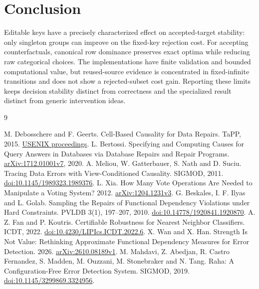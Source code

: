 \documentclass[11pt]{article}
\begin{document}
\section{Conclusion}
Editable keys have a precisely characterized effect on accepted-target
stability: only singleton groups can improve on the fixed-key rejection cost.
For accepting counterfactuals, canonical row dominance preserves exact optima
while reducing raw categorical choices. The implementations have finite
validation and bounded computational value, but reused-source evidence is
concentrated in fixed-infinite transitions and does not show a rejected-subset
cost gain. Reporting these limits keeps decision stability distinct from
correctness and the specialized result distinct from generic intervention ideas.

\begin{thebibliography}{9}
\raggedright
{} M. Debosschere and F. Geerts.
Cell-Based Causality for Data Repairs. TaPP, 2015.
\href{https://www.usenix.org/conference/tapp15/workshop-program/presentation/debosschere}{USENIX proceedings}.
 L. Bertossi. Specifying and Computing Causes for Query
Answers in Databases via Database Repairs and Repair Programs.
\href{https://arxiv.org/abs/1712.01001v7}{arXiv:1712.01001v7}, 2020.
 A. Meliou, W. Gatterbauer, S. Nath and D. Suciu.
Tracing Data Errors with View-Conditioned Causality. SIGMOD, 2011.
\href{https://doi.org/10.1145/1989323.1989376}{doi:10.1145/1989323.1989376}.
 L. Xia. How Many Vote Operations Are Needed to Manipulate a
Voting System? 2012. \href{https://arxiv.org/abs/1204.1231v3}{arXiv:1204.1231v3}.
 G. Beskales, I. F. Ilyas and L. Golab. Sampling the Repairs
of Functional Dependency Violations under Hard Constraints. PVLDB 3(1),
197--207, 2010. \href{https://doi.org/10.14778/1920841.1920870}{doi:10.14778/1920841.1920870}.
 A. Z. Fan and P. Koutris. Certifiable Robustness for Nearest
Neighbor Classifiers. ICDT, 2022.
\href{https://doi.org/10.4230/LIPIcs.ICDT.2022.6}{doi:10.4230/LIPIcs.ICDT.2022.6}.
 X. Wan and X. Han. Strength Is Not Value: Rethinking Approximate
Functional Dependency Measures for Error Detection. 2026.
\href{https://arxiv.org/abs/2610.08189v1}{arXiv:2610.08189v1}.
 M. Mahdavi, Z. Abedjan, R. Castro Fernandez, S. Madden,
M. Ouzzani, M. Stonebraker and N. Tang. Raha: A Configuration-Free Error
Detection System. SIGMOD, 2019.
\href{https://doi.org/10.1145/3299869.3324956}{doi:10.1145/3299869.3324956}.
\end{thebibliography}
\end{document}
